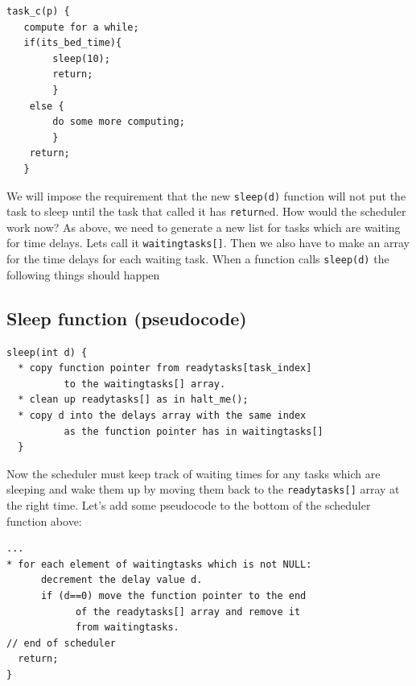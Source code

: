 \begin{verbatim}
task_c(p) {
   compute for a while;
   if(its_bed_time){
        sleep(10);
        return;
        }
    else {
        do some more computing;
        }
    return;
   }
\end{verbatim}

We will impose the requirement that the new {\tt sleep(d)} function will not put the task to sleep until the task that called it has {\tt return}ed.    How would the scheduler work now?
As above, we need to generate a new list for tasks which are waiting for time delays.   Lets call it {\tt waitingtasks[]}.   Then we also have to make an array for 
the time delays for each waiting task.    When a function calls {\tt sleep(d)} the following things should happen


\subsection*{Sleep function (pseudocode)}
\begin{verbatim}
sleep(int d) {
  * copy function pointer from readytasks[task_index] 
          to the waitingtasks[] array. 
  * clean up readytasks[] as in halt_me();
  * copy d into the delays array with the same index 
          as the function pointer has in waitingtasks[]
  }
\end{verbatim}

Now the scheduler must keep track of waiting times for any tasks which are sleeping and  wake them up  by moving them back to the {\tt readytasks[]} array at the right time.
Let's add some pseudocode to the bottom of the scheduler function above:

\begin{verbatim}
...
* for each element of waitingtasks which is not NULL:
      decrement the delay value d.
      if (d==0) move the function pointer to the end
            of the readytasks[] array and remove it 
            from waitingtasks.
// end of scheduler
  return;
}
\end{verbatim}
 

